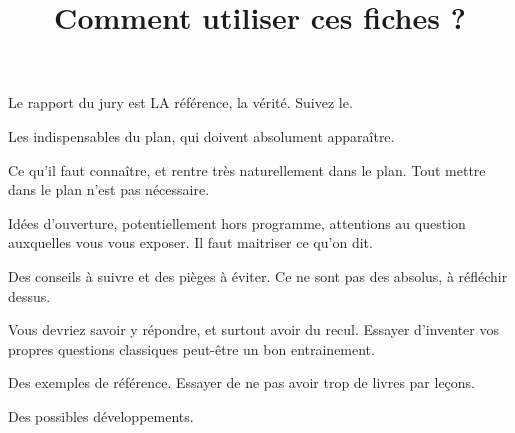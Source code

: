 \documentclass{agregfiche}
\title{Comment utiliser ces fiches ?}
\begin{document}
\maketitle

\secrapports
Le rapport du jury est LA référence, la vérité. Suivez le.
\secindispensables

Les indispensables du plan, qui doivent absolument apparaître.

\secasavoir

Ce qu'il faut connaître, et rentre très naturellement dans le plan. Tout mettre dans le plan n'est pas nécessaire.

\secidees

Idées d'ouverture, potentiellement hors programme, attentions au question auxquelles vous vous exposer. Il faut maitriser ce qu'on dit.

\secpieges

Des conseils à suivre et des pièges à éviter. Ce ne sont pas des absolus, à réfléchir dessus.

\secquestionsclassiques

Vous devriez savoir y répondre, et surtout avoir du recul. Essayer d'inventer vos propres questions classiques peut-être un bon entrainement.

\secreferences

\begin{itemize}
Des exemples de référence. Essayer de ne pas avoir trop de livres par leçons.
\end{itemize}

\secdev
Des possibles développements.
\end{document}
